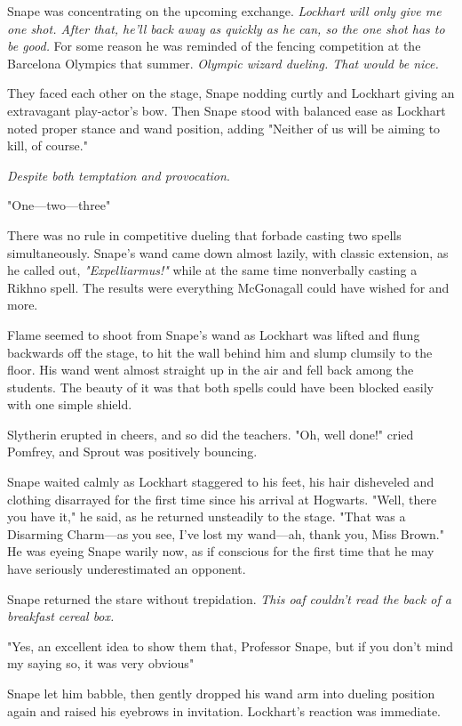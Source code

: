 Snape was concentrating on the upcoming exchange. \emph{Lockhart will only give me one shot. After that, he'll back away as quickly as he can, so the one shot has to be good.} For some reason he was reminded of the fencing competition at the Barcelona Olympics that summer. \emph{Olympic wizard dueling. That would be nice.}

They faced each other on the stage, Snape nodding curtly and Lockhart giving an extravagant play-actor's bow. Then Snape stood with balanced ease as Lockhart noted proper stance and wand position, adding "Neither of us will be aiming to kill, of course."

\emph{Despite both temptation and provocation}.

"One—two—three{\el}"

There was no rule in competitive dueling that forbade casting two spells simultaneously. Snape's wand came down almost lazily, with classic extension, as he called out, \emph{"Expelliarmus!"} while at the same time nonverbally casting a Rikhno spell. The results were everything McGonagall could have wished for and more.

Flame seemed to shoot from Snape's wand as Lockhart was lifted and flung backwards off the stage, to hit the wall behind him and slump clumsily to the floor. His wand went almost straight up in the air and fell back among the students. The beauty of it was that both spells could have been blocked easily with one simple shield.

Slytherin erupted in cheers, and so did the teachers. "Oh, well done!" cried Pomfrey, and Sprout was positively bouncing.

Snape waited calmly as Lockhart staggered to his feet, his hair disheveled and clothing disarrayed for the first time since his arrival at Hogwarts. "Well, there you have it," he said, as he returned unsteadily to the stage. "That{\el} was a Disarming Charm—as you see, I've lost my wand—ah, thank you, Miss Brown." He was eyeing Snape warily now, as if conscious for the first time that he may have seriously underestimated an opponent.

Snape returned the stare without trepidation. \emph{This oaf couldn't read the back of a breakfast cereal box.}

"Yes, an excellent idea to show them that, Professor Snape, but if you don't mind my saying so, it was very obvious{\el}"

Snape let him babble, then gently dropped his wand arm into dueling position again and raised his eyebrows in invitation. Lockhart's reaction was immediate.


